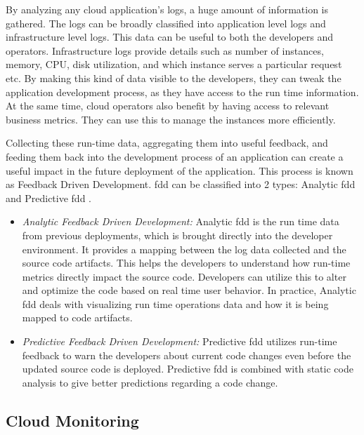 \documentclass[article,type=msc,colorback,12pt,accentcolor=tud8b,table]{tudthesis}
\begin{document}
		By analyzing any cloud application's logs, a huge amount of information is gathered. The logs can be broadly classified into application level logs and infrastructure level logs. This data can be useful to both the developers and operators. Infrastructure logs provide details such as number of instances, memory, CPU, disk utilization, and which instance serves a particular request etc. By making this kind of data visible to the developers, they can tweak the application development process, as they have access to the run time information. At the same time, cloud operators also benefit by having access to relevant business metrics. They can use this to manage the instances more efficiently. 
		
		\par Collecting these run-time data, aggregating them into useful feedback, and feeding them back into the development process of an application can create a useful impact in the future deployment of the application. This process is known as Feedback Driven Development. \gls{fdd} can be classified into 2 types: Analytic \gls{fdd} and Predictive \gls{fdd} \cite{cito2015runtime}.
		
		\begin{itemize}
			\item{\textit{Analytic Feedback Driven Development: }}
			Analytic \gls{fdd} is the run time data from previous deployments, which is brought directly into the developer environment. It provides a mapping between the log data collected and the source code artifacts. This helps the developers to understand how run-time metrics directly impact the source code. Developers can utilize this to alter and optimize the code based on real time user behavior. In practice, Analytic \gls{fdd} deals with visualizing run time operations data and how it is being mapped to code artifacts. 
			
			\item{\textit{Predictive Feedback Driven Development: }}
			 Predictive \gls{fdd} utilizes run-time feedback to warn the developers about current code changes even before the updated source code is deployed. Predictive \gls{fdd} is combined with static code analysis to give better predictions regarding a code change. 
		\end{itemize}
	
	\subsection{Cloud Monitoring}
 	
\end{document}
